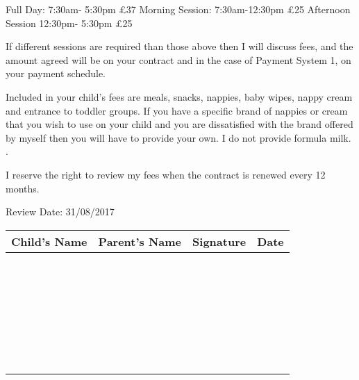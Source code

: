 Full Day: 7:30am- 5:30pm £37
Morning Session: 7:30am-12:30pm £25
Afternoon Session 12:30pm- 5:30pm £25

If different sessions are required than those above then I will discuss fees, and the amount agreed will be on your contract and in the case of Payment System 1, on your payment schedule.

Included in your child's fees are meals, snacks, nappies, baby wipes, nappy cream and entrance to toddler groups. If you have a specific brand of nappies or cream that you wish to use on your child and you are dissatisfied with the brand offered by myself then you will have to provide your own. I do not provide formula milk. . 

I reserve the right to review my fees when the contract is renewed every 12 months.

Review Date: 31/08/2017

\begin{table}[h]
  \def\arraystretch{2.0}
  \begin{tabularx}{\textwidth}{!{\color{gray}\vrule}X!{\color{gray}\vrule}X!{\color{gray}\vrule}X!{\color{gray}\vrule}X!{\color{gray}\vrule}}
    \hline
    Child's Name & Parent's Name & Signature & Date \\
    \hline
    ~ & ~ & ~ & \\
    \hline
    ~ & ~ & ~ & \\
    \hline
    ~ & ~ & ~ & \\
    \hline
    ~ & ~ & ~ & \\
    \hline
    ~ & ~ & ~ & \\
    \hline
    ~ & ~ & ~ & \\
    \hline
  \end{tabularx}
\end{table}




